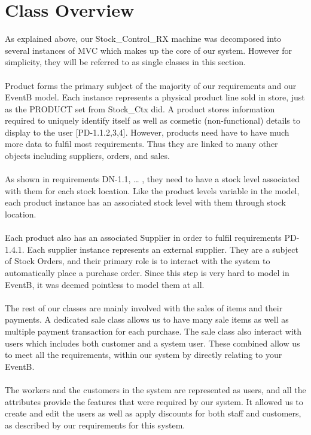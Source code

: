 \documentclass[a4paper]{article}
\begin{document}
\section{Class Overview }
As explained above, our Stock\_Control\_RX machine was decomposed into several instances of MVC which makes up the core of our system. However for simplicity, they will be referred to as single classes in this section. 
\\\\
Product forms the primary subject of the majority of our requirements and our EventB model. Each instance represents a physical product line sold in store, just as the PRODUCT set from Stock\_Ctx did. A product stores information required to uniquely identify itself as well as cosmetic (non-functional) details to display to the user [PD-1.1.{2,3,4}]. 
However, products need have to have much more data to fulfil most requirements. Thus they are linked to many other objects including suppliers, orders, and sales.
\\\\
As shown in requirements DN-1.1, … , they need to have a stock level associated with them for each stock location. Like the product levels variable in the model, each product instance has an associated stock level with them through stock location. 
\\\\
Each product also has an associated Supplier in order to fulfil requirements PD-1.4.1. Each supplier instance represents an external supplier. They are a subject of Stock Orders, and their primary role is to interact with the system to automatically place a purchase order. Since this step is very hard to model in EventB, it was deemed pointless to model them at all.
\\\\
The rest of our classes are mainly involved with the sales of items and their payments. A dedicated sale class allows us to have many sale items as well as multiple payment transaction for each purchase. The sale class also interact with users which includes both customer and a system user. These combined allow us to meet all the requirements, within our system by directly relating to your EventB.
\\\\
The workers and the customers in the system are represented as users, and all the attributes provide the features that were required by our system. It allowed us to create and edit the users as well as apply discounts for both staff and customers, as described by our requirements for this system.
\pagebreak
\end{document}
